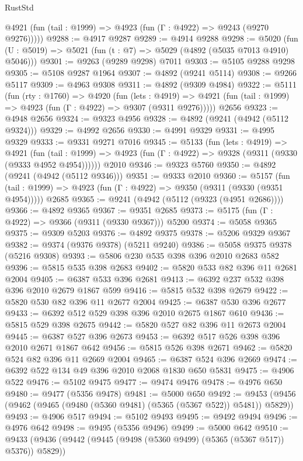 \begin{lexlean}{RustStd}
\begin{coremodule}
      @4921 (fun (tail : @1999) => @4923 (fun (Γ : @4922) => @9243 (@9270 @9276)))))
@9288 := @4917 @9287
@9289 := @4914 @9288
@9298 := @5020 (fun (U : @5019) => @5021 (fun (t : @7) => @5029 (@4892 (@5035 @7013 @4910) @5046)))
@9301 := @9263 (@9289 @9298) @7011
@9303 := @5105 @9288 @9298
@9305 := @5108 @9287 @1964
@9307 := @4892 (@9241 @5114)
@9308 := @9266 @5117
@9309 := @4963 @9308
@9311 := @4892 (@9309 @4984)
@9322 := @5111
    (fun (rty : @1760) =>
    @4920
      (fun (lets : @4919) =>
      @4921 (fun (tail : @1999) => @4923 (fun (Γ : @4922) => @9307 (@9311 @9276)))))
    @2656
@9323 := @4948 @2656
@9324 := @9323 @4956
@9328 := @4892 (@9241 (@4942 (@5112 @9324)))
@9329 := @4992 @2656
@9330 := @4991 @9329
@9331 := @4995 @9329
@9333 := @9331 @9271 @7016
@9345 := @5133
    (fun (lets : @4919) =>
    @4921
      (fun (tail : @1999) => @4923 (fun (Γ : @4922) => @9328 (@9311 (@9330 (@9333 @4952 @4954))))))
    @2010
@9346 := @9323 @5760
@9350 := @4892 (@9241 (@4942 (@5112 @9346)))
@9351 := @9333 @2010
@9360 := @5157
    (fun (tail : @1999) => @4923 (fun (Γ : @4922) => @9350 (@9311 (@9330 (@9351 @4954)))))
    @2685
@9365 := @9241 (@4942 (@5112 (@9323 (@4951 @2686))))
@9366 := @4892 @9365
@9367 := @9351 @2685
@9373 := @5175 (fun (Γ : @4922) => @9366 (@9311 (@9330 @9367))) @5200
@9374 := @5058 @9365
@9375 := @9309 @5203
@9376 := @4892 @9375
@9378 := @5206 @9329 @9367
@9382 := @9374 (@9376 @9378) (@5211 @9240)
@9386 := @5058 @9375 @9378 (@5216 @9308)
@9393 := @5806 @230 @535 @398 @396 @2010 @2683 @582
@9396 := @5815 @535 @398 @2683
@9402 := @5820 @533 @82 @396 @11 @2681 @2004
@9405 := @6387 @533 @396 @2681
@9413 := @6392 @237 @532 @398 @396 @2010 @2679 @1867 @599
@9416 := @5815 @532 @398 @2679
@9422 := @5820 @530 @82 @396 @11 @2677 @2004
@9425 := @6387 @530 @396 @2677
@9433 := @6392 @512 @529 @398 @396 @2010 @2675 @1867 @610
@9436 := @5815 @529 @398 @2675
@9442 := @5820 @527 @82 @396 @11 @2673 @2004
@9445 := @6387 @527 @396 @2673
@9453 := @6392 @517 @526 @398 @396 @2010 @2671 @1867 @642
@9456 := @5815 @526 @398 @2671
@9462 := @5820 @524 @82 @396 @11 @2669 @2004
@9465 := @6387 @524 @396 @2669
@9474 := @6392 @522 @134 @49 @396 @2010 @2068 @1830 @650 @5831
@9475 := @4906 @522
@9476 := @5102 @9475
@9477 := @9474 @9476
@9478 := @4976 @650
@9480 := @9477 (@5356 @9478)
@9481 := @5000 @650
@9492 := @9453 (@9456 (@9462 (@9465 (@9480 (@5360 @9481) (@5365 (@5367 @522)) @5481)) @5829))
@9493 := @4906 @517
@9494 := @5102 @9493
@9495 := @9492 @9494
@9496 := @4976 @642
@9498 := @9495 (@5356 @9496)
@9499 := @5000 @642
@9510 := @9433 (@9436 (@9442 (@9445 (@9498 (@5360 @9499) (@5365 (@5367 @517)) @5376)) @5829))

\end{coremodule}
\end{lexlean}
